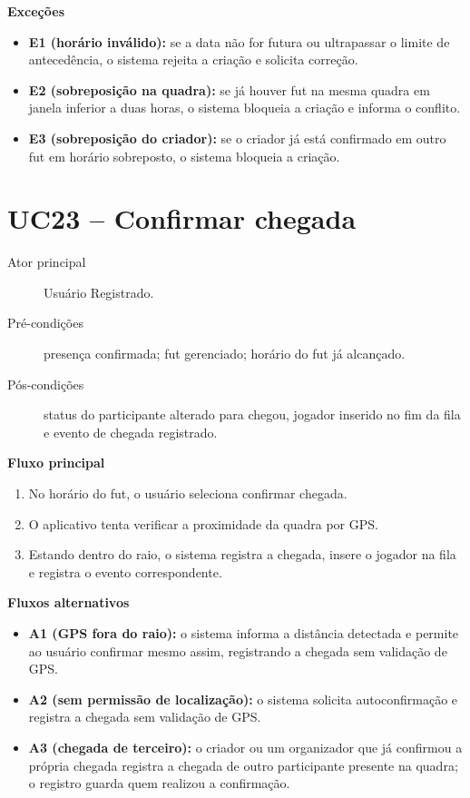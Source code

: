 \begin{apendicesenv}
        \noindent\textbf{Exceções}
        \begin{itemize}
            \item \textbf{E1 (horário inválido):} se a data não for futura ou ultrapassar o limite de antecedência, o sistema rejeita a criação e solicita correção.
            \item \textbf{E2 (sobreposição na quadra):} se já houver fut na mesma quadra em janela inferior a duas horas, o sistema bloqueia a criação e informa o conflito.
            \item \textbf{E3 (sobreposição do criador):} se o criador já está confirmado em outro fut em horário sobreposto, o sistema bloqueia a criação.
        \end{itemize}

    \section*{UC23 -- Confirmar chegada}
        \begin{description}
            \item[Ator principal] Usuário Registrado.
            \item[Pré-condições] presença confirmada; fut gerenciado; horário do fut já alcançado.
            \item[Pós-condições] status do participante alterado para chegou, jogador inserido no fim da fila e evento de chegada registrado.
        \end{description}

        \noindent\textbf{Fluxo principal}
        \begin{enumerate}
            \item No horário do fut, o usuário seleciona confirmar chegada.
            \item O aplicativo tenta verificar a proximidade da quadra por GPS.
            \item Estando dentro do raio, o sistema registra a chegada, insere o jogador na fila e registra o evento correspondente.
        \end{enumerate}

        \noindent\textbf{Fluxos alternativos}
        \begin{itemize}
            \item \textbf{A1 (GPS fora do raio):} o sistema informa a distância detectada e permite ao usuário confirmar mesmo assim, registrando a chegada sem validação de GPS.
            \item \textbf{A2 (sem permissão de localização):} o sistema solicita autoconfirmação e registra a chegada sem validação de GPS.
            \item \textbf{A3 (chegada de terceiro):} o criador ou um organizador que já confirmou a própria chegada registra a chegada de outro participante presente na quadra; o registro guarda quem realizou a confirmação.
        \end{itemize}


\end{apendicesenv}
